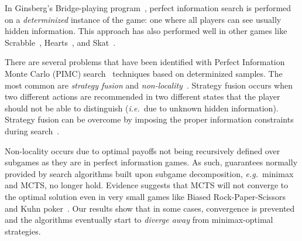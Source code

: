 \documentclass{aamas2015}
\newcommand{\ie}{{\it i.e.}~}
\newcommand{\eg}{{\it e.g.}~}
\begin{document}

In Ginsberg's Bridge-playing program~\cite{Ginsberg96Partition,Ginsberg01}, perfect information search is 
performed on a {\it determinized} instance of the game: one where all players can see usually hidden information. 
This approach has also performed well in other games like Scrabble~\cite{Sheppard02World}, 
Hearts~\cite{Sturtevant08An}, and Skat~\cite{Buro09Improving}. 


There are several problems that have been identified with Perfect Information Monte Carlo
(PIMC) search~\cite{Long10Understanding} techniques
based on determinized samples. The most common are {\it strategy fusion} and {\it non-locality}~\cite{Frank98Finding}.
Strategy fusion occurs when two different actions are recommended in two different states that the player 
should not be able to distinguish (\ie due to unknown hidden information).
Strategy fusion can be overcome by imposing the proper information constraints during 
search~\cite{Frank98Finding,Ciancarini10Kriegspiel,Ponsen11Computing,Lisy12peg,Cowling12ISMCTS}. 

Non-locality occurs due to optimal payoffs not being recursively defined over subgames as they are 
in perfect information games. As such, guarantees normally provided by search algorithms built upon 
subgame decomposition, \eg minimax and MCTS, no longer hold. 
Evidence suggests that MCTS will not converge to the optimal solution even in very
small games like Biased Rock-Paper-Scissors and Kuhn poker~\cite{Shafiei09,Ponsen11Computing}.
Our results show that in some cases, convergence is prevented and the algorithms eventually start to  
{\it diverge away} from minimax-optimal strategies.

\end{document}
